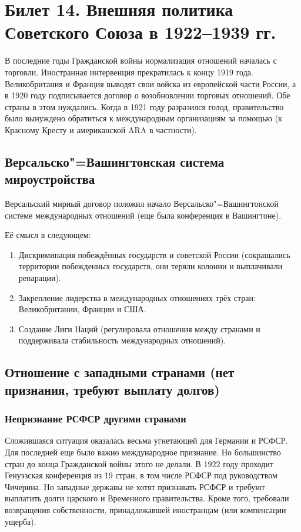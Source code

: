 \section{Билет 14. Внешняя политика Советского Союза в 1922--1939 гг.}

В последние годы Гражданской войны нормализация отношений началась с торговли. Иностранная интервенция прекратилась к концу 1919 года. Великобритания и Франция выводят свои войска из европейской части России, а в 1920 году подписывается договор о возобновлении торговых отношений. Обе страны в этом нуждались. Когда в 1921 году разразился голод, правительство было вынуждено обратиться к международным организациям за помощью (к Красному Кресту и американской ARA в частности). 

\subsection{Версальско"=Вашингтонская система мироустройства}

Версальский мирный договор положил начало Версальско"=Вашингтонской системе международных отношений (еще была конференция в Вашингтоне). 

Её смысл в следующем:

\begin{enumerate}
    \item Дискриминация побеждённых государств и советской России (сокращались территории побежденных государств, они теряли колонии и выплачивали репарации).
    \item Закрепление лидерства в международных отношениях трёх стран: Великобритании, Франции и США.
    \item Создание Лиги Наций (регулировала отношения между странами и поддерживала стабильность международных отношений).
\end{enumerate}

\subsection{Отношение с западными странами (нет признания, требуют выплату долгов)}

\subsubsection{\textbf{Непризнание РСФСР другими странами}}

Сложившаяся ситуация оказалась весьма угнетающей для Германии и РСФСР. Для последней еще было важно международное признание. Но большинство стран до конца Гражданской войны этого не делали. В 1922 году проходит Генуэзская конференция из 19 стран, в том числе РСФСР под руководством Чичерина. Но западные державы не хотят признавать РСФСР и требуют выплатить долги царского и Временного правительства. Кроме того, требовали возвращения собственности, принадлежавшей иностранцам (или компенсации ущерба). 

